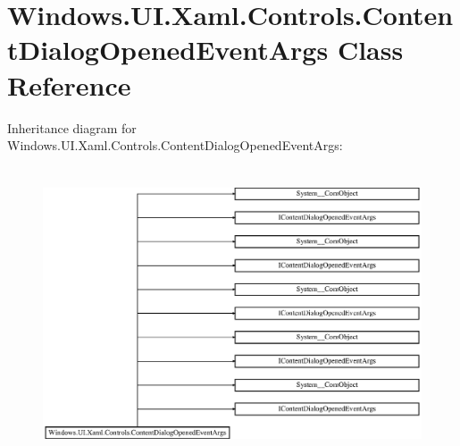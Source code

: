 \hypertarget{class_windows_1_1_u_i_1_1_xaml_1_1_controls_1_1_content_dialog_opened_event_args}{}\section{Windows.\+U\+I.\+Xaml.\+Controls.\+Content\+Dialog\+Opened\+Event\+Args Class Reference}
\label{class_windows_1_1_u_i_1_1_xaml_1_1_controls_1_1_content_dialog_opened_event_args}
Inheritance diagram for Windows.\+U\+I.\+Xaml.\+Controls.\+Content\+Dialog\+Opened\+Event\+Args\+:\begin{figure}[H]
\begin{center}
\leavevmode
\includegraphics[height=8.676057cm]{class_windows_1_1_u_i_1_1_xaml_1_1_controls_1_1_content_dialog_opened_event_args}
\end{center}
\end{figure}
